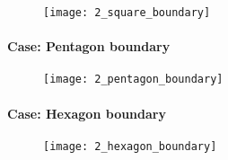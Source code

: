 \begin{figure}[H]
	\centering
	\texttt{[image: 2\_square\_boundary]}
\end{figure}

\paragraph{Case: Pentagon boundary}

\begin{figure}[h]
	\centering
	\texttt{[image: 2\_pentagon\_boundary]}
\end{figure}

\paragraph{Case: Hexagon boundary}
\begin{figure}[H]
	\centering
	\texttt{[image: 2\_hexagon\_boundary]}
\end{figure}














